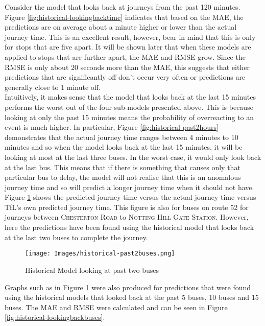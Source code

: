 Consider the model that looks back at journeys from the past 120 minutes. Figure \ref{fig:historical-lookingbacktime} indicates that based on the MAE, the predictions are on average about a minute higher or lower than the actual journey time. This is an excellent result, however, bear in mind that this is only for stops that are five apart. It will be shown later that when these models are applied to stops that are further apart, the MAE and RMSE grow. Since the RMSE is only about 20 seconds more than the MAE, this suggests that either predictions that are significantly off don't occur very often or predictions are generally close to 1 minute off. \\

Intuitively, it makes sense that the model that looks back at the last 15 minutes performs the worst out of the four sub-models presented above. This is because looking at only the past 15 minutes means the probability of overreacting to an event is much higher. In particular, Figure \ref{fig:historical-past2hours} demonstrates that the actual journey time ranges between 4 minutes to 10 minutes and so when the model looks back at the last 15 minutes, it will be looking at most at the last three buses. In the worst case, it would only look back at the last bus. This means that if there is something that causes only that particular bus to delay, the model will not realise that this is an anomalous journey time and so will predict a longer journey time when it should not have. \\

Figure \ref{fig:historical-past2buses} shows the predicted journey time versus the actual journey time versus TfL's own predicted journey time. This figure is also for buses on route 52 for journeys between \textsc{Chesterton Road} to \textsc{Notting Hill Gate Station}. However, here the predictions have been found using the historical model that looks back at the last two buses to complete the journey.

\begin{figure}[H]
\begin{center}
    \texttt{[image: Images/historical-past2buses.png]}
    \caption{Historical Model looking at past two buses}
    \label{fig:historical-past2buses}
\end{center}
\end{figure}

Graphs such as in Figure \ref{fig:historical-past2buses} were also produced for predictions that were found using the historical models that looked back at the past 5 buses, 10 buses and 15 buses. The MAE and RMSE were calculated and can be seen in Figure \ref{fig:historical-lookingbackbuses}.

